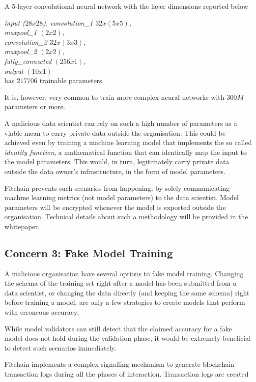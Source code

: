 \documentclass[12pt, a4paper,titlepage]{extreport}
\begin{document}
A 5-layer convolutional neural network with the layer dimensions reported below

\textit{
input ($28x28$), convolution\_1 $32x(5x5)$, \\
maxpool\_1 $(2x2)$, \\
convolution\_2 $32x(3x3)$, \\
maxpool\_2 $(2x2)$, \\
fully\_connected $(256x1)$, \\ 
output $(10x1)$ } \\

has $217706$ trainable parameters. 

It is, however, very common to train more complex neural networks with $300M$ parameters or more. 

A malicious data scientist can rely on such a high number of parameters as a viable mean to carry private data outside the organisation. This could be achieved even by training a machine learning model that implements the so called \textit{identity function}, a mathematical function that can identically map the input to the model parameters. This would, in turn, legitimately carry private data outside the data owner's infrastructure, in the form of model parameters. 

Fitchain prevents such scenarios from happening, by solely communicating machine learning metrics (not model parameters) to the data scientist. Model parameters will be encrypted whenever the model is exported outside the organisation. Technical details about such a methodology will be provided in the whitepaper.

\subsection{Concern 3: Fake Model Training}
A malicious organisation have several options to fake model training. Changing the schema of the training set right after a model has been submitted from a data scientist, or changing the data directly (and keeping the same schema) right before training a model, are only a few strategies to create models that perform with erroneous accuracy.

While model validators can still detect that the claimed accuracy for a fake model does not hold during the validation phase, it would be extremely beneficial to detect such scenarios immediately. 

Fitchain implements a complex signalling mechanism to generate blockchain transaction logs during all the phases of interaction. Transaction logs are created  
\end{document}
